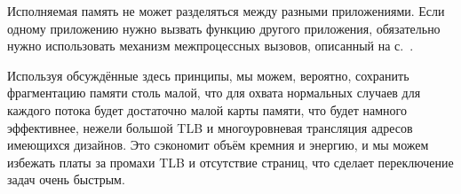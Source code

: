 \documentclass[forwardcom.tex]{subfiles}
\begin{document}
Исполняемая память не может разделяться между разными приложениями. Если одному приложению нужно вызвать функцию другого приложения, обязательно нужно использовать механизм межпроцессных вызовов, описанный на с.~\pageref{interProcessCalls}. 

Используя обсуждённые здесь принципы, мы можем, вероятно, сохранить фрагментацию памяти столь малой, что для охвата нормальных случаев для каждого потока будет достаточно малой карты памяти, что будет намного эффективнее, нежели большой TLB и многоуровневая трансляция адресов имеющихся дизайнов. Это сэкономит объём кремния и энергию, и мы можем избежать платы за промахи TLB и отсутствие страниц, что сделает переключение задач очень быстрым.
\end{document}
